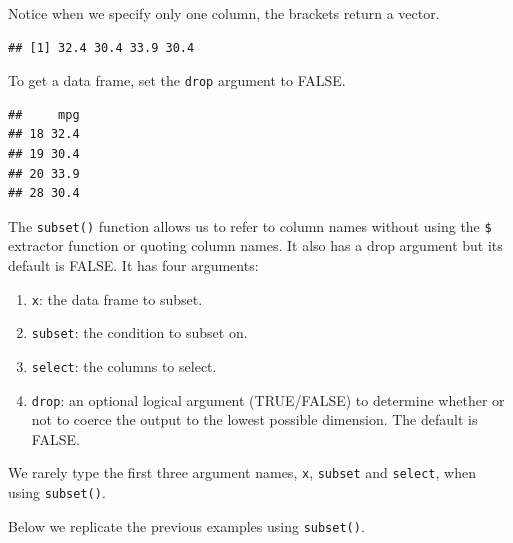 \documentclass[
]{book}
\newenvironment{Shaded}{\begin{snugshade}}{\end{snugshade}}
\newcommand{\ConstantTok}[1]{\textcolor[rgb]{0.00,0.00,0.00}{#1}}
\newcommand{\DecValTok}[1]{\textcolor[rgb]{0.00,0.00,0.81}{#1}}
\newcommand{\NormalTok}[1]{#1}
\newcommand{\OtherTok}[1]{\textcolor[rgb]{0.56,0.35,0.01}{#1}}
\newcommand{\SpecialCharTok}[1]{\textcolor[rgb]{0.00,0.00,0.00}{#1}}
\newcommand{\StringTok}[1]{\textcolor[rgb]{0.31,0.60,0.02}{#1}}
\providecommand{\tightlist}{%
  \setlength{\itemsep}{0pt}\setlength{\parskip}{0pt}}
\begin{document}
Notice when we specify only one column, the brackets return a vector.

\begin{Shaded}
\end{Shaded}

\begin{verbatim}
## [1] 32.4 30.4 33.9 30.4
\end{verbatim}

To get a data frame, set the \texttt{drop} argument to FALSE.

\begin{Shaded}
\end{Shaded}

\begin{verbatim}
##     mpg
## 18 32.4
## 19 30.4
## 20 33.9
## 28 30.4
\end{verbatim}

The \texttt{subset()} function allows us to refer to column names without using the \texttt{\$} extractor function or quoting column names. It also has a drop argument but its default is FALSE. It has four arguments:

\begin{enumerate}
\def\labelenumi{\arabic{enumi}.}
\tightlist
\item
  \texttt{x}: the data frame to subset.
\item
  \texttt{subset}: the condition to subset on.
\item
  \texttt{select}: the columns to select.
\item
  \texttt{drop}: an optional logical argument (TRUE/FALSE) to determine whether or not to coerce the output to the lowest possible dimension. The default is FALSE.
\end{enumerate}

We rarely type the first three argument names, \texttt{x}, \texttt{subset} and \texttt{select}, when using \texttt{subset()}.

Below we replicate the previous examples using \texttt{subset()}.
\end{document}
